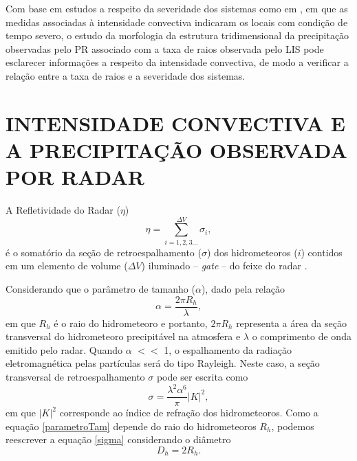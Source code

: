 Com base em estudos a respeito da severidade dos sistemas como em , em que as medidas  associadas à intensidade convectiva indicaram os locais com condição de tempo severo, o estudo da morfologia da estrutura tridimensional da precipitação observadas pelo PR associado com a taxa de raios observada pelo LIS pode esclarecer informações a respeito da intensidade convectiva, de modo a verificar a relação entre a taxa de raios e a severidade dos sistemas. 


\section{INTENSIDADE CONVECTIVA E A PRECIPITAÇÃO OBSERVADA POR RADAR}
\label{introRadar}

A Refletividade do Radar ($\eta$)
\begin{equation}
\eta = \sum_{i=1, 2, 3 ... }^{\Delta V} \sigma_i,
\label{refletividade}
\end{equation}
é o somatório da seção de retroespalhamento ($\sigma$) dos hidrometeoros ($i$) contidos em um elemento de volume ($\Delta V$) iluminado -- \textit{gate} -- do feixe do radar \cite{battan1973}.


Considerando que o parâmetro de tamanho ($\alpha$), dado pela relação 
\begin{equation}
\alpha = \dfrac{2\pi R_{h} }{\lambda},
\label{parametroTam} 
\end{equation}
em que $R_{h}$ é o raio do hidrometeoro e portanto, $2\pi R_{h}$ representa a área da seção transversal do hidrometeoro precipitável na atmosfera e $\lambda$ o comprimento de onda emitido pelo radar.  Quando $\alpha$ $<<$ 1, o espalhamento da radiação eletromagnética pelas partículas será do tipo Rayleigh. Neste caso, a seção transversal de retroespalhamento $\sigma$ pode ser escrita como 
\begin{equation}
\sigma = \dfrac{\lambda^2 \alpha^6}{\pi} |K|^2,
\label{sigma}
\end{equation}
em que $|K|^2$ corresponde ao índice de refração dos hidrometeoros. Como a equação \ref{parametroTam} depende do raio do hidrometeoros $R_h$, podemos reescrever a equação \ref{sigma} considerando o diâmetro 
\begin{equation}
D_h = 2 R_h.
\label{diametro}
\end{equation}

